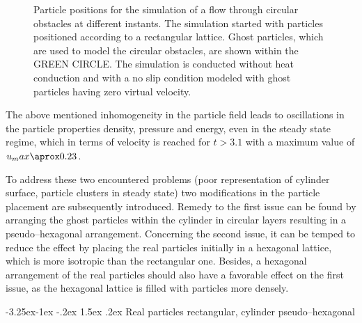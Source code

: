 \documentclass{report}
\makeatletter
\renewcommand\paragraph{\@startsection{paragraph}{4}{\z@}%
  {-3.25ex\@plus -1ex \@minus -.2ex}%
  {1.5ex \@plus .2ex}%
  {\normalfont\normalsize\bfseries}}
\makeatother
\begin{document}
\begin{figure}[!htbp]
{}

\caption[particle positions for Porosities]{Particle positions for the simulation of a flow through circular obstacles at different instants. The simulation started with particles positioned according to a rectangular lattice. Ghost particles, which are used to model the circular obstacles, are shown within the GREEN CIRCLE. The simulation is conducted without heat conduction and with a no slip condition modeled with ghost particles having zero virtual velocity.}

\end{figure}

The above mentioned inhomogeneity in the particle field leads to oscillations in the particle properties density, pressure and energy, even in the steady state regime, which in terms of velocity is reached for $t>3.1$ with a maximum value of $u_max\aprox 0.23$. 

To address these two encountered problems (poor representation of cylinder surface, particle clusters in steady state) two modifications in the particle placement are subsequently introduced. Remedy to the first issue can be found by arranging the ghost particles within the cylinder in circular layers resulting in a pseudo--hexagonal arrangement. Concerning the second issue, it can be temped to reduce the effect by placing the real particles initially in a hexagonal lattice, which is more isotropic than the rectangular one. Besides, a hexagonal arrangement of the real particles should also have a favorable effect on the first issue, as the hexagonal lattice is filled with particles more densely.

\paragraph{Real particles rectangular, cylinder pseudo--hexagonal}
\end{document}
